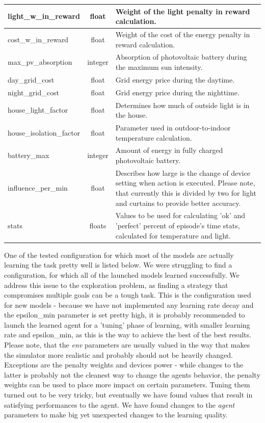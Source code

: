 \documentclass{article}
\begin{document}
{\begin{longtable}{l|c|p{9cm}}
    \hline
    light\_w\_in\_reward & float & Weight of the light penalty in reward calculation.\\
    \hline
    cost\_w\_in\_reward & float & Weight of the cost of the energy penalty in reward calculation.\\
    \hline
    max\_pv\_absorption & integer & Absorption of photovoltaic battery during the maximum sun intensity.\\
    \hline
    day\_grid\_cost & float & Grid energy price during the daytime.\\
    \hline
    night\_grid\_cost & float & Grid energy price during the nighttime.\\
    \hline
    house\_light\_factor & float & Determines how much of outside light is in the house.\\
    \hline
    house\_isolation\_factor & float & Parameter used in outdoor-to-indoor temperature calculation.\\
    \hline
    battery\_max & integer & Amount of energy in fully charged photovoltaic battery.\\
    \hline
    influence\_per\_min & float & Describes how large is the change of device setting when action is executed. Please note, that currently this is divided by two for light and curtains to provide better accuracy.\\
    \hline
    stats & floats & Values to be used for calculating 'ok' and 'perfect' percent of episode's time stats, calculated for temperature and light. 
\end{longtable}}

One of the tested configuration for which most of the models are actually learning the task pretty well is listed below. We were struggling to find a configuration, for which all of the launched models learned successfully. We address this issue to the exploration problem, as finding a strategy that compromises multiple goals can be a tough task. This is the configuration used for new models - because we have not implemented any learning rate decay and the epsilon\_min parameter is set pretty high, it is probably recommended to launch the learned agent for a 'tuning' phase of learning, with smaller learning rate and epsilon\_min, as this is the way to achieve the best of the best results. Please note, that the \textit{env} parameters are usually valued in the way that makes the simulator more realistic and probably should not be heavily changed. Exceptions are the penalty weights and devices power - while changes to the latter is probably not the cleanest way to change the agents behavior, the penalty weights can be used to place more impact on certain parameters. Tuning them turned out to be very tricky, but eventually we have found values that result in satisfying performances to the agent. We have found changes to the \textit{agent} parameters to make big yet unexpected changes to the learning quality. 
\end{document}
